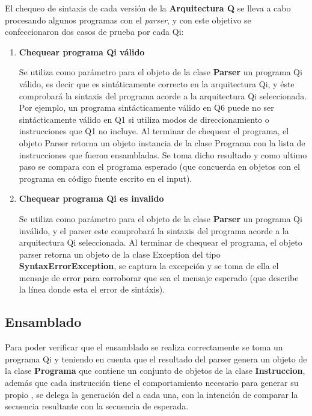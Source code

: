 El chequeo de sintaxis de cada versión de la \textbf{Arquitectura Q} se lleva a cabo procesando algunos programas con el \textit{parser}, y con este objetivo se confeccionaron  dos casos de prueba por cada Qi:
\begin{enumerate}
\item \textbf{Chequear programa Qi válido}

Se utiliza como parámetro para el objeto de la clase \textbf{Parser} un programa Qi válido, es decir que es sintáticamente correcto en la arquitectura Qi, y éste comprobará la sintaxis del programa acorde a la arquitectura Qi seleccionada. Por ejemplo, un programa sintácticamente válido en Q6 puede no ser sintácticamente válido en Q1 si utiliza modos de direccionamiento o instrucciones que Q1 no incluye. Al terminar de chequear el programa, el objeto Parser retorna un objeto instancia de la clase Programa con la lista de instrucciones que fueron ensambladas. 
Se toma dicho resultado y como ultimo paso se compara con el programa esperado (que concuerda en objetos con el programa en código fuente escrito en el input).


\item \textbf{Chequear programa Qi es invalido} 

Se utiliza como parámetro para el objeto de la clase \textbf{Parser}  un programa Qi inválido, y el parser este comprobará la sintaxis del programa acorde a la arquitectura Qi seleccionada. Al terminar de chequear el programa, el objeto parser retorna un objeto de la clase Exception del tipo \textbf{SyntaxErrorException}, se captura la excepción y se toma de ella el mensaje de error para corroborar que sea el mensaje esperado (que describe la línea donde esta el error de sintáxis).

\end{enumerate}
\subsection{Ensamblado}

Para poder verificar que el ensamblado se realiza correctamente se toma un programa Qi y teniendo en cuenta que el resultado del parser genera un objeto de la clase \textbf{Programa} que contiene un conjunto de objetos de la clase \textbf{Instruccion}, además que cada instrucción tiene el comportamiento necesario para generar su propio \codmaq, se delega la generación del \codmaq a cada una, con la intención de comparar la secuencia resultante con la secuencia de \codmaq esperada.

